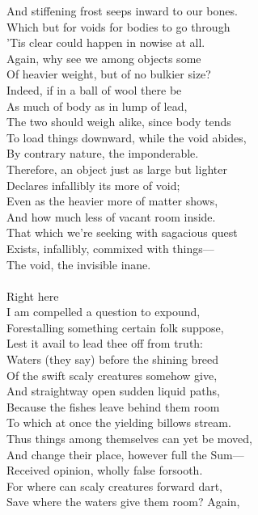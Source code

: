 And stiffening frost seeps inward to our bones.\\
Which but for voids for bodies to go through\\
'Tis clear could happen in nowise at all.\\
Again, why see we among objects some\\
Of heavier weight, but of no bulkier size?\\
Indeed, if in a ball of wool there be\\
As much of body as in lump of lead,\\
The two should weigh alike, since body tends\\
To load things downward, while the void abides,\\
By contrary nature, the imponderable.\\
Therefore, an object just as large but lighter\\
Declares infallibly its more of void;\\
Even as the heavier more of matter shows,\\
And how much less of vacant room inside.\\
That which we're seeking with sagacious quest\\
Exists, infallibly, commixed with things—\\
The void, the invisible inane.\\
\\
Right here\\
I am compelled a question to expound,\\
Forestalling something certain folk suppose,\\
Lest it avail to lead thee off from truth:\\
Waters (they say) before the shining breed\\
Of the swift scaly creatures somehow give,\\
And straightway open sudden liquid paths,\\
Because the fishes leave behind them room\\
To which at once the yielding billows stream.\\
Thus things among themselves can yet be moved,\\
And change their place, however full the Sum—\\
Received opinion, wholly false forsooth.\\
For where can scaly creatures forward dart,\\
Save where the waters give them room? Again,\\
